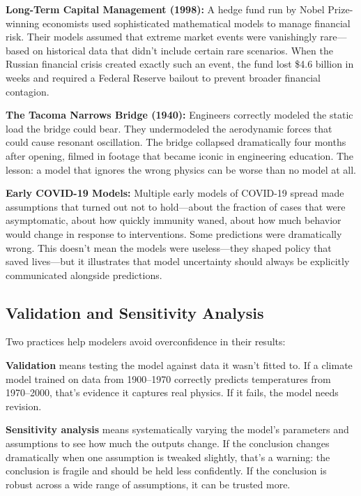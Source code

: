 \documentclass[11pt,letterpaper]{article}
\begin{document}
\begin{warningbox}
\textbf{Long-Term Capital Management (1998):} A hedge fund run by Nobel Prize-winning economists used sophisticated mathematical models to manage financial risk. Their models assumed that extreme market events were vanishingly rare---based on historical data that didn't include certain rare scenarios. When the Russian financial crisis created exactly such an event, the fund lost \$4.6 billion in weeks and required a Federal Reserve bailout to prevent broader financial contagion.

\textbf{The Tacoma Narrows Bridge (1940):} Engineers correctly modeled the static load the bridge could bear. They undermodeled the aerodynamic forces that could cause resonant oscillation. The bridge collapsed dramatically four months after opening, filmed in footage that became iconic in engineering education. The lesson: a model that ignores the wrong physics can be worse than no model at all.

\textbf{Early COVID-19 Models:} Multiple early models of COVID-19 spread made assumptions that turned out not to hold---about the fraction of cases that were asymptomatic, about how quickly immunity waned, about how much behavior would change in response to interventions. Some predictions were dramatically wrong. This doesn't mean the models were useless---they shaped policy that saved lives---but it illustrates that model uncertainty should always be explicitly communicated alongside predictions.
\end{warningbox}

\subsection{Validation and Sensitivity Analysis}

Two practices help modelers avoid overconfidence in their results:

\textbf{Validation} means testing the model against data it wasn't fitted to. If a climate model trained on data from 1900--1970 correctly predicts temperatures from 1970--2000, that's evidence it captures real physics. If it fails, the model needs revision.

\textbf{Sensitivity analysis} means systematically varying the model's parameters and assumptions to see how much the outputs change. If the conclusion changes dramatically when one assumption is tweaked slightly, that's a warning: the conclusion is fragile and should be held less confidently. If the conclusion is robust across a wide range of assumptions, it can be trusted more.
\end{document}
